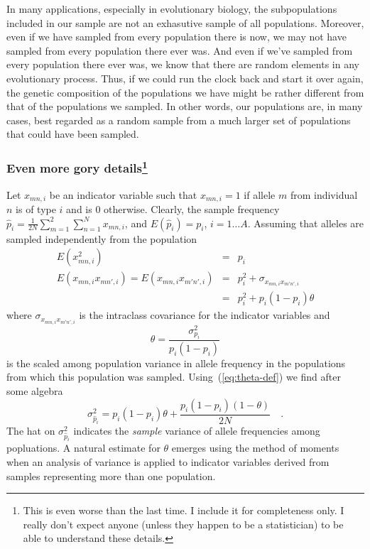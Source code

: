 \documentclass[12pt]{article}
\begin{document}
In many applications, especially in evolutionary biology, the
subpopulations included in our sample are not an exhasutive sample of
all populations. Moreover, even if we have sampled from every
population there is now, we may not have sampled from every population
there ever was. And even if we've sampled from every population there
ever was, we know that there are random elements in any evolutionary
process. Thus, if we could run the clock back and start it over again,
the genetic composition of the populations we have might be rather
different from that of the populations we sampled. In other words, our
populations are, in many cases, best regarded as a random sample from
a much larger set of populations that could have been
sampled.

\subsubsection*{Even more gory details\footnote{This is even worse
    than the last time. I include it for completeness only. I really
    don't expect anyone (unless they happen to be a statistician) to
    be able to understand these details.}}

Let $x_{mn,i}$ be an indicator variable such that $x_{mn,i} = 1$ if
allele $m$ from individual $n$ is of type $i$ and is 0
otherwise. Clearly, the sample frequency $\hat p_i =
\frac{1}{2N}\sum_{m=1}^2\sum_{n=1}^Nx_{mn,i}$, and $E(\hat p_i) =
p_i$, $i=1\dots A$. Assuming that alleles are sampled independently
from the population
\begin{eqnarray*}
E(x^2_{mn,i}) &=& p_i \\
E(x_{mn,i}x_{mn',i}) = E(x_{mn,i}x_{m'n',i}) &=& p_i^2 + \sigma_{x_{mn,i}x_{m'n',i}} \\
&=& p_i^2 + p_i(1-p_i)\theta
\end{eqnarray*}
where $\sigma_{x_{mn,i}x_{m'n',i}}$ is the intraclass covariance for
the indicator variables and
\begin{equation}
\theta = \frac{\sigma^2_{p_i}}{p_i(1-p_i)} \label{eq:theta-def}
\end{equation}
is the scaled among population variance in allele frequency in the
populations from which this population was
sampled. Using~(\ref{eq:theta-def}) we find after some algebra
\[
\sigma^2_{\hat p_i} = p_i(1-p_i)\theta +
\frac{p_i(1-p_i)(1-\theta)}{2N} \quad .
\]
The hat on $\sigma^2_{\hat p_i}$ indicates the {\it sample\/} variance
of allele frequencies among popluations. A natural estimate for
$\theta$ emerges using the method of moments when an analysis of
variance is applied to indicator variables derived from samples
representing more than one population.
\end{document}
